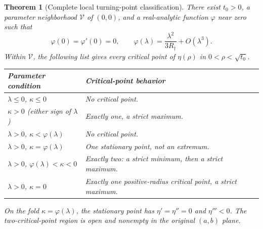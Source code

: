 \documentclass[11pt,a4paper]{article}
\newtheorem{theorem}{Theorem}[section]
\theoremstyle{definition}\newtheorem{definition}[theorem]{Definition}
\theoremstyle{remark}\newtheorem{remark}[theorem]{Remark}
\newcommand{\rbrr}{R_\dagger}
\numberwithin{equation}{section}
\begin{document}
\begin{theorem}[Complete local turning-point classification]
\label{rbif:thm:unfolding}
There exist $t_0>0$, a parameter neighborhood $\mathcal V$ of $(0,0)$,
and a real-analytic function $\varphi$ near zero such that
\begin{equation}
 \varphi(0)=\varphi'(0)=0,\qquad
 \varphi(\lambda)=\frac{\lambda^2}{3\rbrr}+O(\lambda^3).
 \label{rbif:eq:fold}
\end{equation}
Within $\mathcal V$, the following list gives every critical point of
$\eta(\rho)$ in $0<\rho<\sqrt{t_0}$.
\begin{center}
\begin{tabular}{@{}p{}p{}@{}}
\toprule
Parameter condition & Critical-point behavior\\
\midrule
$\lambda\le0$, $\kappa\le0$ & No critical point.\\[1mm]
$\kappa>0$ (either sign of $\lambda$) & Exactly one, a strict maximum.\\[1mm]
$\lambda>0$, $\kappa<\varphi(\lambda)$ & No critical point.\\[1mm]
$\lambda>0$, $\kappa=\varphi(\lambda)$ & One stationary point, not an extremum.\\[1mm]
$\lambda>0$, $\varphi(\lambda)<\kappa<0$
 & Exactly two: a strict minimum, then a strict maximum.\\[1mm]
$\lambda>0$, $\kappa=0$ & Exactly one positive-radius critical point, a strict maximum.\\
\bottomrule
\end{tabular}
\end{center}
On the fold $\kappa=\varphi(\lambda)$, the stationary point has
$\eta'=\eta''=0$ and $\eta'''<0$. The two-critical-point region is open
and nonempty in the original $(a,b)$ plane.
\end{theorem}
\end{document}
